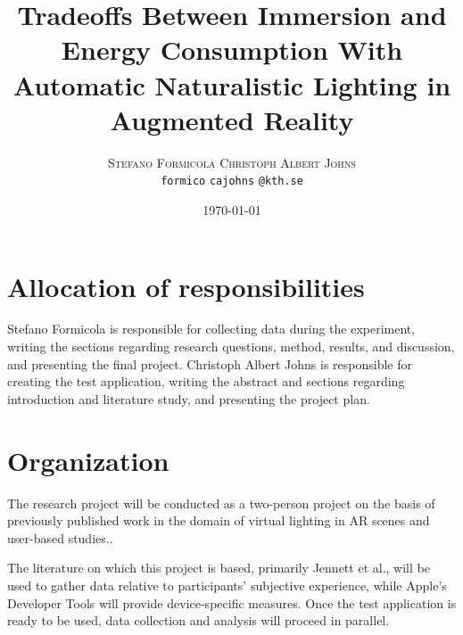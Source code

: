 \documentclass[12pt,twoside,english]{article}
\title{Tradeoffs Between Immersion and Energy Consumption With Automatic Naturalistic Lighting in Augmented Reality}
\author{
        \textsc{Stefano Formicola}
            \qquad
        \textsc{Christoph Albert Johns}
        \mbox{}\\
        \normalsize
            \texttt{formico}
        \textbar{}
            \texttt{cajohns}
        \normalsize
            \texttt{@kth.se}
}
\date{\today}
\begin{document}
\maketitle






\section{Allocation of responsibilities}
\label{sect:alloc_responsibilities}

Stefano Formicola is responsible for collecting data during the experiment, writing the sections regarding research questions, method, results, and discussion, and presenting the final project.
Christoph Albert Johns is responsible for creating the test application, writing the abstract and sections regarding introduction and literature study, and presenting the project plan.


\section{Organization}
\label{sect:organization}

The research project will be conducted as a two-person project on the basis of previously published work in the domain of virtual lighting in \gls{AR} scenes and user-based studies.. 

The literature on which this project is based, primarily Jennett et al.\cite{jennett_measuring_2008}, will be used to gather data relative to participants' subjective experience, while Apple's Developer Tools will provide device-specific measures.
Once the test application is ready to be used, data collection and analysis will proceed in parallel.
\end{document}
